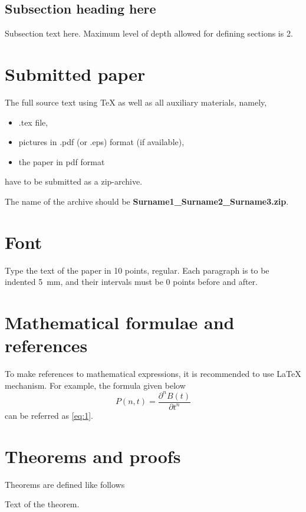 \documentclass[10pt]{article}
\begin{document}
\subsection{Subsection heading here}

Subsection text here. Maximum level of depth allowed for defining sections is 2.



\section{Submitted paper}

The full source text using \TeX{} as well as all auxiliary
materials, namely,
\begin{itemize}
  \item .tex file,
  \item pictures in .pdf (or .eps) format (if available),
  \item the paper in pdf format
\end{itemize}
have to be submitted as a zip-archive.

The name of the archive should be
\textbf{Surname1\_Surname2\_Surname3.zip}.

\section{Font}

Type the text of the paper in 10 points, regular. Each
paragraph is to be indented 5~mm, and their intervals must be 0
points before and after.

\section{Mathematical formulae and references}

To make references to mathematical expressions, it is
recommended to use \LaTeX{} mechanism. For example, the formula
given below
\begin{equation}
\label{eq:1}
P(n,t)=\frac{\partial^n B(t)}{\partial t^n}
\end{equation}
can be referred as \eqref{eq:1}.

\section{Theorems and proofs}

Theorems are defined like follows
\begin{thm}\label{thm1}
Text of the theorem.
\end{thm}
\end{document}
